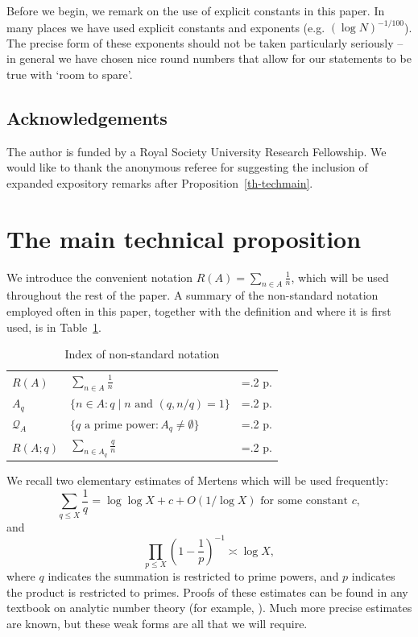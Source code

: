 \documentclass[12pt]{amsart}
\newcommand{\brac}[1]{\left( #1\right)}
\begin{document}
Before we begin, we remark on the use of explicit constants in this paper. In many places we have used explicit constants and exponents (e.g. $(\log N)^{-1/100}$). The precise form of these exponents should not be taken particularly seriously -- in general we have chosen nice round numbers that allow for our statements to be true with `room to spare'.

\subsection*{Acknowledgements}
The author is funded by a Royal Society University Research Fellowship. We would like to thank the anonymous referee for suggesting the inclusion of expanded expository remarks after Proposition~\ref{th-techmain}. 

\section{The main technical proposition}\label{sec2}
We introduce the convenient notation $R(A)=\sum_{n\in A}\frac{1}{n}$\label{def-ra}, which will be used throughout the rest of the paper. A summary of the non-standard notation employed often in this paper, together with the definition and where it is first used, is in Table~\ref{tab-not}.

\renewcommand{\arraystretch}{1.5}
\begin{table}[h!]
\centering
\caption{Index of non-standard notation}
\label{tab-not}
\begin{tabularx}{1\textwidth} {
| >{\centering\arraybackslash\hsize=1\hsize}X | >{\centering\arraybackslash\hsize1.8\hsize}X | >{\centering\arraybackslash\hsize=.2\hsize}X |
}
 \hline
 $R(A)$ & $\sum_{n\in A}\frac{1}{n}$ & p.\pageref{def-ra}\\
 $A_q$ & $\{ n\in A: q\mid n\textrm{ and }(q,n/q)=1\}$ & p.\pageref{def-aq}\\
 $\mathcal{Q}_A$ & $\{ q\textrm{ a prime power}: A_q\neq \emptyset\}$ & p.\pageref{def-qa}\\
 $R(A;q)$ & $\sum_{n\in A_q}\frac{q}{n}$ & p.\pageref{def-raq}\\
 \hline
\end{tabularx}

\end{table}


 We recall two elementary estimates of Mertens which will be used frequently:
\begin{equation}\label{mertens1}
\sum_{q\leq X}\frac{1}{q}= \log\log X+c+O(1/\log X)\textrm{ for some constant }c,
\end{equation}
and
\begin{equation}\label{mertens2}
\prod_{p\leq X}\brac{1-\frac{1}{p}}^{-1}\asymp \log X,
\end{equation}
where $q$ indicates the summation is restricted to prime powers, and $p$ indicates the product is restricted to primes. Proofs of these estimates can be found in any textbook on analytic number theory (for example, \cite[Chapter 2]{MV}). Much more precise estimates are known, but these weak forms are all that we will require.
\end{document}
